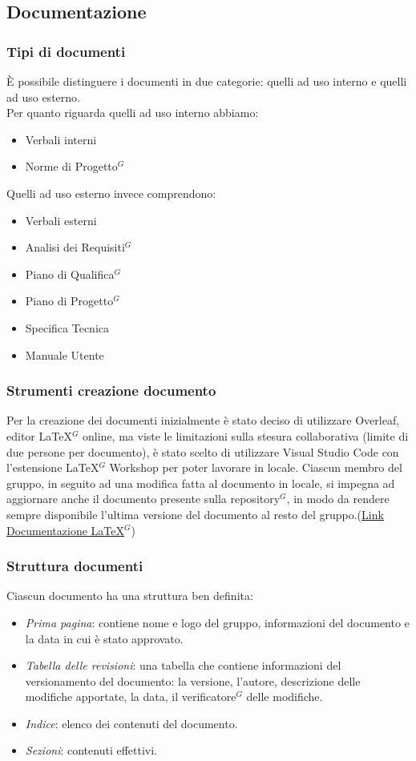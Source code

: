 \documentclass[a4paper,10pt]{article}
\begin{document}
\subsection{Documentazione}
\subsubsection{Tipi di documenti}
È possibile distinguere i documenti in due categorie: quelli ad uso interno e quelli ad uso esterno. \\
Per quanto riguarda quelli ad uso interno abbiamo:
\begin{itemize}
  \item Verbali interni 
  \item Norme di Progetto$^G$
\end{itemize}
Quelli ad uso esterno invece comprendono:
\begin{itemize}
  \item Verbali esterni
  \item Analisi dei Requisiti$^G$
  \item Piano di Qualifica$^G$
  \item Piano di Progetto$^G$
  \item Specifica Tecnica
  \item Manuale Utente
\end{itemize}
\subsubsection{Strumenti creazione documento}
Per la creazione dei documenti inizialmente è stato deciso di utilizzare Overleaf, editor LaTeX$^G$ online, ma viste le limitazioni
sulla stesura collaborativa (limite di due persone per documento), è stato scelto di utilizzare Visual Studio Code con l'estensione
LaTeX$^G$ Workshop per poter lavorare in locale. Ciascun membro del gruppo, in seguito ad una modifica fatta al documento in locale,
si impegna ad aggiornare anche il documento presente sulla repository$^G$, in modo da rendere sempre disponibile l'ultima versione
del documento al resto del gruppo.(\href{https://www.latex-project.org/help/documentation/}{\underline{Link Documentazione LaTeX$^G$}})
\subsubsection{Struttura documenti}
Ciascun documento ha una struttura ben definita:
\begin{itemize}
  \item \textit{Prima pagina}: contiene nome e logo del gruppo, informazioni del documento e la data in cui è stato approvato.
  \item \textit{Tabella delle revisioni}: una tabella che contiene informazioni del versionamento del documento: la versione,
  l'autore, descrizione delle modifiche apportate, la data, il verificatore$^G$ delle modifiche.
  \item \textit{Indice}: elenco dei contenuti del documento.
  \item \textit{Sezioni}: contenuti effettivi.
\end{itemize}
\end{document}
